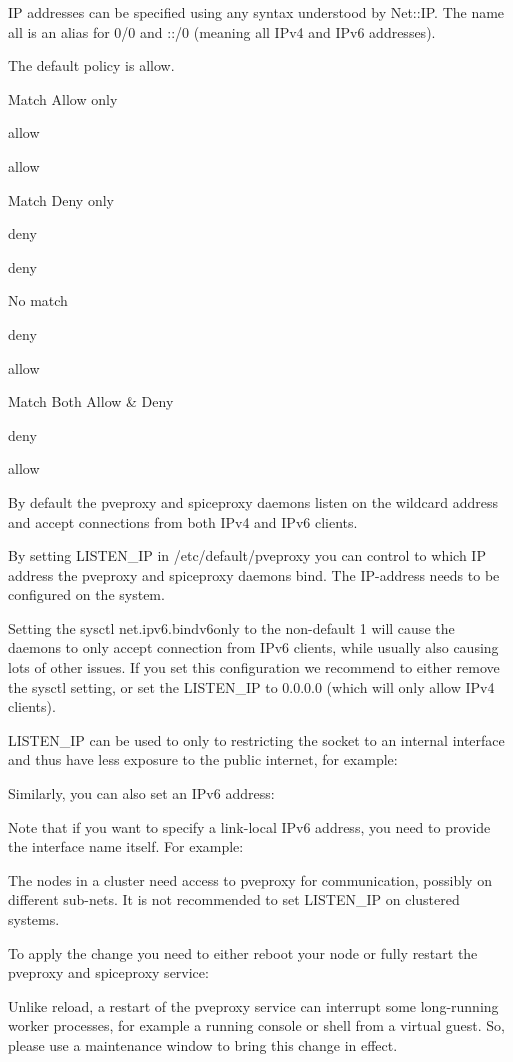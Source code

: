 IP addresses can be specified using any syntax understood by Net::IP. The name all is an alias for 0/0 and ::/0 (meaning all IPv4 and IPv6 addresses).

The default policy is allow.

Match Allow only

allow

allow

Match Deny only

deny

deny

No match

deny

allow

Match Both Allow & Deny

deny

allow

By default the pveproxy and spiceproxy daemons listen on the wildcard address and accept connections from both IPv4 and IPv6 clients.

By setting LISTEN_IP in /etc/default/pveproxy you can control to which IP address the pveproxy and spiceproxy daemons bind. The IP-address needs to be configured on the system.

Setting the sysctl net.ipv6.bindv6only to the non-default 1 will cause the daemons to only accept connection from IPv6 clients, while usually also causing lots of other issues. If you set this configuration we recommend to either remove the sysctl setting, or set the LISTEN_IP to 0.0.0.0 (which will only allow IPv4 clients).

LISTEN_IP can be used to only to restricting the socket to an internal interface and thus have less exposure to the public internet, for example:

Similarly, you can also set an IPv6 address:

Note that if you want to specify a link-local IPv6 address, you need to provide the interface name itself. For example:

The nodes in a cluster need access to pveproxy for communication, possibly on different sub-nets. It is not recommended to set LISTEN_IP on clustered systems.

To apply the change you need to either reboot your node or fully restart the pveproxy and spiceproxy service:

Unlike reload, a restart of the pveproxy service can interrupt some long-running worker processes, for example a running console or shell from a virtual guest. So, please use a maintenance window to bring this change in effect.

